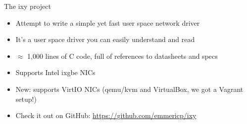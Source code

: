 \documentclass[NET,english,aspectratio=169,notitleframe]{tumbeamer}
\begin{document}
\begin{frame}{The ixy project}
\begin{itemize}
\item Attempt to write a simple yet fast user space network driver
\item It's a user space driver you can easily understand and read
\item $\approx$ 1,000 lines of C code, full of references to datasheets and specs
\item Supports Intel ixgbe NICs %
\item New: supports VirtIO NICs (qemu/kvm and VirtualBox, we got a Vagrant setup!)
\item Check it out on GitHub: \url{https://github.com/emmericp/ixy}
\end{itemize}
\end{frame}
\end{document}
